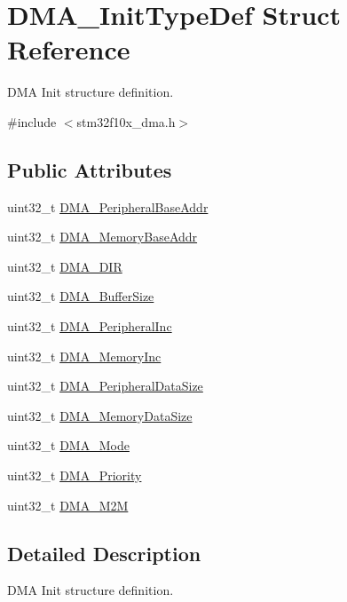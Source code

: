 \hypertarget{structDMA__InitTypeDef}{
\section{DMA\_\-InitTypeDef Struct Reference}
\label{structDMA__InitTypeDef}
}


DMA Init structure definition.  




{\ttfamily \#include $<$stm32f10x\_\-dma.h$>$}

\subsection*{Public Attributes}
\begin{DoxyCompactItemize}
\item 
uint32\_\-t \hyperlink{structDMA__InitTypeDef_a232af556de7c2eec9a82d448730bd86d}{DMA\_\-PeripheralBaseAddr}
\item 
uint32\_\-t \hyperlink{structDMA__InitTypeDef_a41e7d463f0cfbcedf3170d7d27d088df}{DMA\_\-MemoryBaseAddr}
\item 
uint32\_\-t \hyperlink{structDMA__InitTypeDef_a91b47435ccf4a40efa97bbbe631789e1}{DMA\_\-DIR}
\item 
uint32\_\-t \hyperlink{structDMA__InitTypeDef_a999df57215b28b3b1b3b6836c4952ca5}{DMA\_\-BufferSize}
\item 
uint32\_\-t \hyperlink{structDMA__InitTypeDef_ad4d427790f9a089ca0257a358fc263c2}{DMA\_\-PeripheralInc}
\item 
uint32\_\-t \hyperlink{structDMA__InitTypeDef_aaf69c680a297ec01a2ed613289e691a1}{DMA\_\-MemoryInc}
\item 
uint32\_\-t \hyperlink{structDMA__InitTypeDef_afb46aaadfb80a7e19277c868bd252554}{DMA\_\-PeripheralDataSize}
\item 
uint32\_\-t \hyperlink{structDMA__InitTypeDef_a74bb71921c4d198d6cf1979c120f694f}{DMA\_\-MemoryDataSize}
\item 
uint32\_\-t \hyperlink{structDMA__InitTypeDef_a8adbe6f3e46471d109afaa3111dce220}{DMA\_\-Mode}
\item 
uint32\_\-t \hyperlink{structDMA__InitTypeDef_ab9a17bd51778478cbd728c868206dca0}{DMA\_\-Priority}
\item 
uint32\_\-t \hyperlink{structDMA__InitTypeDef_a57944cc447e6fcde4e9aa6229d3b4c5d}{DMA\_\-M2M}
\end{DoxyCompactItemize}


\subsection{Detailed Description}
DMA Init structure definition. 

